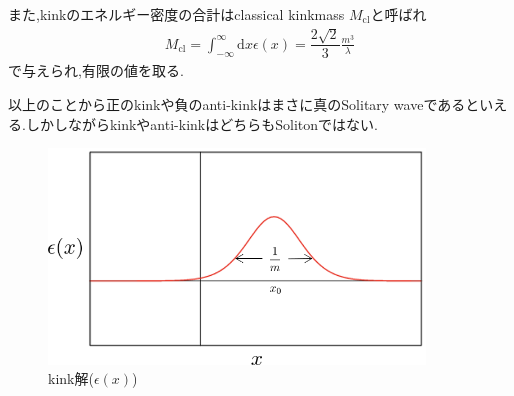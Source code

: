 \documentclass[dvipdfmx,11pt,a4paper,oneside,openany]{jsbook}
\begin{document}
また,kinkのエネルギー密度の合計はclassical kinkmass $M_{\mathrm{cl}}$と呼ばれ
\begin{align}
    M_{\mathrm{cl}}=\int_{-\infty}^{\infty} \mathrm{d}x \epsilon(x)=\dfrac{2\sqrt{2}}{3}\frac{m^3}{\lambda}
\end{align}
で与えられ,有限の値を取る.

以上のことから正のkinkや負のanti-kinkはまさに真のSolitary waveであるといえる.しかしながらkinkやanti-kinkはどちらもSolitonではない.
\begin{figure}[H]
    \centering
    \includegraphics[width=10cm]{figure/kink_energy.png}
    \caption{kink解($\epsilon(x)$)}
    \label{kink_energy}
\end{figure}
\end{document}
